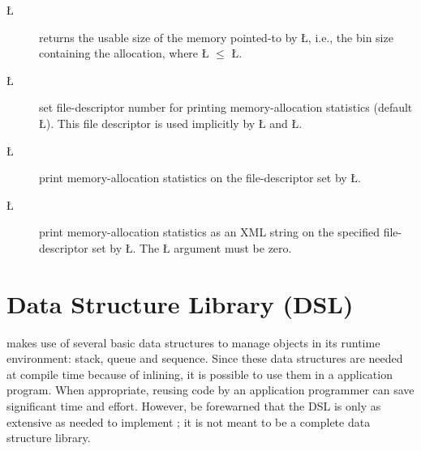 \documentclass[openright,twoside]{report}
\begin{document}
\begin{description}
\item[\LGinlinetrue\LGbegin\lgrinde\L{}\endlgrinde\LGend{}] returns the usable size of the memory pointed-to by \LGinlinetrue\LGbegin\lgrinde\L{}\endlgrinde\LGend{}, i.e., the bin size containing the allocation, where \LGinlinetrue\LGbegin\lgrinde\L{}\endlgrinde\LGend{} $\le$ \LGinlinetrue\LGbegin\lgrinde\L{}\endlgrinde\LGend{}.
\item[\LGinlinetrue\LGbegin\lgrinde\L{}\endlgrinde\LGend{}] set file-descriptor number for printing memory-allocation statistics (default \LGinlinetrue\LGbegin\lgrinde\L{}\endlgrinde\LGend{}).
This file descriptor is used implicitly by \LGinlinetrue\LGbegin\lgrinde\L{}\endlgrinde\LGend{} and \LGinlinetrue\LGbegin\lgrinde\L{}\endlgrinde\LGend{}.
\item[\LGinlinetrue\LGbegin\lgrinde\L{}\endlgrinde\LGend{}] print memory-allocation statistics on the file-descriptor set by \LGinlinetrue\LGbegin\lgrinde\L{}\endlgrinde\LGend{}.
\item[\LGinlinetrue\LGbegin\lgrinde\L{}\endlgrinde\LGend{}] print memory-allocation statistics as an XML string on the specified file-descriptor set by \LGinlinetrue\LGbegin\lgrinde\L{}\endlgrinde\LGend{}.
The \LGinlinetrue\LGbegin\lgrinde\L{}\endlgrinde\LGend{} argument must be zero.
\end{description}


\chapter{Data Structure Library (DSL)}
\label{s:DataStructureLibrary}
%

\uC makes use of several basic data structures to manage objects in its runtime environment: stack, queue and sequence.
Since these data structures are needed at compile time because of inlining, it is possible to use them in a \uC application program.
When appropriate, reusing code by an application programmer can save significant time and effort.
However, be forewarned that the \uC DSL is only as extensive as needed to implement \uC;
it is not meant to be a complete data structure library.
\end{document}
